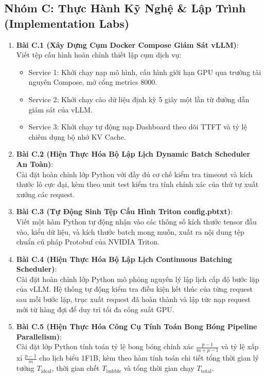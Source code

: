 \subsection{Nhóm C: Thực Hành Kỹ Nghệ \& Lập Trình (Implementation Labs)}
\begin{enumerate}
  \item \textbf{Bài C.1 (Xây Dựng Cụm Docker Compose Giám Sát vLLM)}: \\
  Viết tệp cấu hình  hoàn chỉnh thiết lập cụm dịch vụ:
  \begin{itemize}
    \item Service 1: Khởi chạy  nạp mô hình, cấu hình giới hạn GPU qua trường tài nguyên Compose, mở cổng metrics 8000.
    \item Service 2: Khởi chạy  cào dữ liệu định kỳ 5 giây một lần từ đường dẫn giám sát của vLLM.
    \item Service 3: Khởi chạy  tự động nạp Dashboard theo dõi TTFT và tỷ lệ chiếm dụng bộ nhớ KV Cache.
  \end{itemize}

  \item \textbf{Bài C.2 (Hiện Thực Hóa Bộ Lập Lịch Dynamic Batch Scheduler An Toàn)}: \\
  Cài đặt hoàn chỉnh lớp Python  với đầy đủ cơ chế kiểm tra timeout và kích thước lô cực đại, kèm theo unit test kiểm tra tính chính xác của thứ tự xuất xưởng các request.

  \item \textbf{Bài C.3 (Tự Động Sinh Tệp Cấu Hình Triton config.pbtxt)}: \\
  Viết một hàm Python tự động nhận vào các thông số kích thước tensor đầu vào, kiểu dữ liệu, và kích thước batch mong muốn, xuất ra nội dung tệp  chuẩn cú pháp Protobuf của NVIDIA Triton.

  \item \textbf{Bài C.4 (Hiện Thực Hóa Bộ Lập Lịch Continuous Batching Scheduler)}: \\
  Cài đặt hoàn chỉnh lớp Python  mô phỏng nguyên lý lập lịch cấp độ bước lặp của vLLM. Hệ thống tự động kiểm tra điều kiện kết thúc của từng request sau mỗi bước lặp, trục xuất request đã hoàn thành và lập tức nạp request mới từ hàng đợi để duy trì tối đa công suất GPU.

  \item \textbf{Bài C.5 (Hiện Thực Hóa Công Cụ Tính Toán Bong Bóng Pipeline Parallelism)}: \\
  Cài đặt lớp Python  tính toán tỷ lệ bong bóng chính xác $\frac{p-1}{m+p-1}$ và tỷ lệ xấp xỉ $\frac{p-1}{m}$ cho lịch biểu 1F1B, kèm theo hàm tính toán chi tiết tổng thời gian lý tưởng $T_{\text{ideal}}$, thời gian chết $T_{\text{bubble}}$ và tổng thời gian chạy $T_{\text{total}}$.
\end{enumerate}

